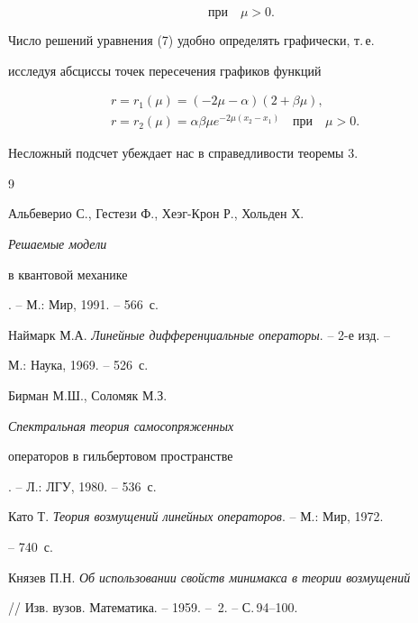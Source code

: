 \begin{pf}
\begin{equation}
\quad 


\text{при} 


\quad \mu>0. 


\end{equation} 


Число решений уравнения (7) удобно определять графически, т.\,е. 


исследуя абсциссы точек пересечения графиков функций 


\begin{gather*} 


r=r_1(\mu)=(-2\mu-\alpha)(2+\beta\mu), \\ 


r=r_2(\mu)=\alpha\beta\mu e^{-2\mu(x_2-x_1)}\quad 


\text{при} 


\quad \mu>0. 


\end{gather*} 


Несложный подсчет убеждает нас в справедливости теоремы 3. 


\end{pf} 


 


\begin{thebibliography}{9} 


 




Альбеверио С., Гестези Ф., Хеэг-Крон Р., Хольден Х. {\em Решаемые модели 


в квантовой механике}. -- М.: Мир, 1991. -- 566~с. 




Наймарк М.А. {\em Линейные дифференциальные операторы}. -- 2-е изд. -- 


М.: Наука, 1969. -- 526~с. 




Бирман М.Ш., Соломяк М.З. {\em Спектральная теория самосопряженных 


операторов в гильбертовом пространстве}. -- Л.: ЛГУ, 1980. -- 536~с. 




Като Т. {\em Теория возмущений линейных операторов}. -- М.: Мир, 1972. 


-- 740~с. 




Князев П.Н. {\em Об использовании свойств минимакса в теории возмущений} 


// Изв. вузов. Математика. -- 1959. -- \No\,2. -- С.\,94--100. 


 


\end{thebibliography} 


